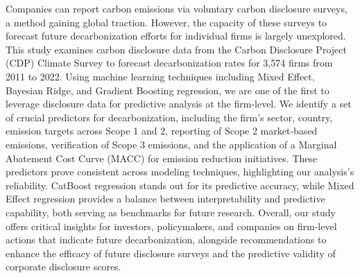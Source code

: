 Companies can report carbon emissions via voluntary carbon disclosure surveys, a method gaining global traction. However, the capacity of these surveys to forecast future decarbonization efforts for individual firms is largely unexplored. This study examines carbon disclosure data from the Carbon Disclosure Project (CDP) Climate Survey to forecast decarbonization rates for 3,574 firms from 2011 to 2022. Using machine learning techniques including Mixed Effect, Bayesian Ridge, and Gradient Boosting regression, we are one of the first to leverage disclosure data for predictive analysis at the firm-level. We identify a set of crucial predictors for decarbonization, including the firm's sector, country, emission targets across Scope 1 and 2, reporting of Scope 2 market-based emissions, verification of Scope 3 emissions, and the application of a Marginal Abatement Cost Curve (MACC) for emission reduction initiatives. These predictors prove consistent across modeling techniques, highlighting our analysis's reliability. CatBoost regression stands out for its predictive accuracy, while Mixed Effect regression provides a balance between interpretability and predictive capability, both serving as benchmarks for future research. Overall, our study offers critical insights for investors, policymakers, and companies on firm-level actions that indicate future decarbonization, alongside recommendations to enhance the efficacy of future disclosure surveys and the predictive validity of corporate disclosure scores.